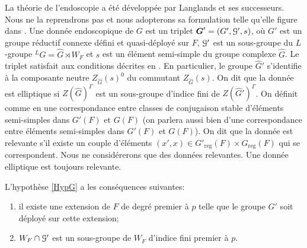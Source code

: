 \documentclass[11pt]{article}
\numberwithin{equation}{section}\providecommand{\og}{«\,}\providecommand{\fg}{\,»}
\let\mathcal \EuScript
\newcommand{\reg}{\mathrm{reg}}
\newcommand{\bG}{\boldsymbol{G}}
\newcommand{\cG}{\mathcal{G}}
\theoremstyle{plain}
\theoremstyle{definition}
\begin{document}
La théorie de l'endoscopie a été développée par Langlands et ses successeurs. Nous ne la reprendrons pas et nous adopterons sa formulation telle qu'elle figure dans \cite{MW}. Une donnée endoscopique de $G$ est un triplet $\bG'=(G',\cG',s)$, où $G'$ est un groupe réductif connexe défini et quasi-déployé sur $F$, $\cG'$ est un sous-groupe du $L$-groupe $^LG=\hat{G}\rtimes W_{F}$ et $s$ est un élément semi-simple du groupe complexe $\hat{G}$. Le triplet satisfait aux conditions décrites en \cite[I.1.5]{MW}. En particulier, le groupe $\hat{G}'$ s'identifie à la composante neutre $Z_{\hat{G}}(s)^0$ du commutant $Z_{\hat{G}}(s)$. On dit que la donnée est elliptique si $Z(\hat{G})^{\Gamma}$ est un sous-groupe d'indice fini de $Z(\hat{G}')^{\Gamma}$. On définit comme en \cite[I.1.10]{MW} une correspondance entre classes de conjugaison stable d'éléments semi-simples dans $G'(F)$ et $G(F)$ (on parlera aussi bien d'une correspondance entre éléments semi-simples dans $G'(F)$ et $G(F)$). On dit que la donnée est relevante s'il existe un couple d'éléments $(x',x)\in G'_{\reg}(F)\times G_{\reg}(F)$ qui se correspondent. Nous ne considérerons que des données relevantes. Une donnée elliptique est toujours relevante.

L'hypothèse \ref{HypG} a les conséquences suivantes:
\begin{enumerate}
\item\label{donneesendoscopiques1}
il existe une extension de $F$ de degré premier à $p$ telle que le groupe $G'$ soit déployé sur cette extension;

\item\label{donneesendoscopiques2}
$W_{F}\cap \cG'$ est un sous-groupe de $W_{F}$ d'indice fini premier à $p$.
\end{enumerate}
\end{document}
